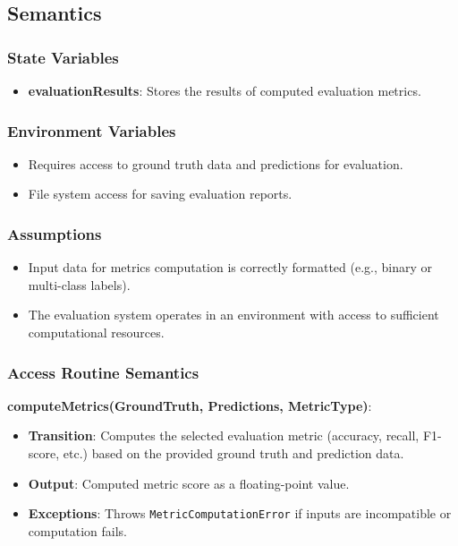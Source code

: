 \documentclass[12pt, titlepage]{article}
\begin{document}
\subsection{Semantics}

\subsubsection{State Variables}
\begin{itemize}
    \item \textbf{evaluationResults}: Stores the results of computed evaluation metrics.
\end{itemize}

\subsubsection{Environment Variables}
\begin{itemize}
    \item Requires access to ground truth data and predictions for evaluation.
    \item File system access for saving evaluation reports.
\end{itemize}

\subsubsection{Assumptions}
\begin{itemize}
    \item Input data for metrics computation is correctly formatted (e.g., binary or multi-class labels).
    \item The evaluation system operates in an environment with access to sufficient computational resources.
\end{itemize}

\subsubsection{Access Routine Semantics}

\textbf{computeMetrics(GroundTruth, Predictions, MetricType)}:
\begin{itemize}
    \item \textbf{Transition}: Computes the selected evaluation metric (accuracy, recall, F1-score, etc.) based on the provided ground truth and prediction data.
    \item \textbf{Output}: Computed metric score as a floating-point value.
    \item \textbf{Exceptions}: Throws \texttt{MetricComputationError} if inputs are incompatible or computation fails.
\end{itemize}
\end{document}
